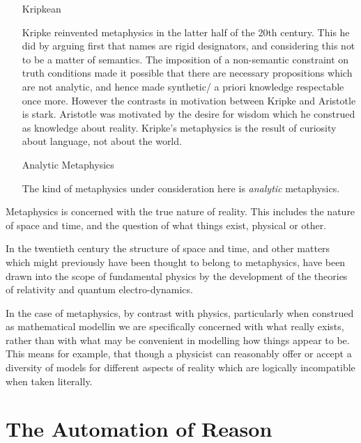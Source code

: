\documentclass{rbjk}
\begin{document}
\begin{article}
\begin{itemize}
\item[Kripkean]

Kripke reinvented metaphysics in the latter half of the 20th century.
This he did by arguing first that names are rigid designators, and considering this not to be a matter of semantics.
The imposition of a non-semantic constraint on truth conditions made it possible that there are necessary propositions which are not analytic, and hence made synthetic/ a priori knowledge respectable once more.
However the contrasts in motivation between Kripke and Aristotle is stark.
Aristotle was motivated by the desire for wisdom which he construed as knowledge about reality.
Kripke's metaphysics is the result of curiosity about language, not about the world.

\item[Analytic Metaphysics]

The kind of metaphysics under consideration here is {\it analytic} metaphysics.
\end{itemize}

Metaphysics is concerned with the true nature of reality.
This includes the nature of space and time, and the question of what things exist, physical or other.

In the twentieth century the structure of space and time, and other matters which might previously have been thought to belong to metaphysics, have been drawn into the scope of fundamental physics by the development of the theories of relativity and quantum electro-dynamics.

In the case of metaphysics, by contrast with physics, particularly when construed as mathematical modellin we are specifically concerned with what really exists, rather than with what may be convenient in modelling how things appear to be.
This means for example, that though a physicist can reasonably offer or accept a diversity of models for different aspects of reality which are logically incompatible when taken literally.

\section{The Automation of Reason}



%
%

\end{article}
\end{document}
